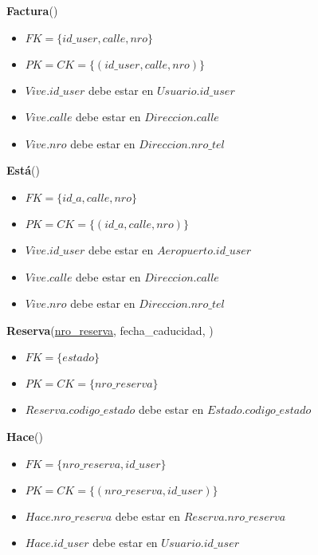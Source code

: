 \vspace*{0.1cm}
\noindent
\textbf{Factura}(\underline{})
\begin{itemize}[noitemsep]
    \item $FK = \{id\_user, calle, nro\}$
    \item $PK = CK = \{(id\_user, calle, nro)\}$
    \item $Vive.id\_user$ debe estar en $Usuario.id\_user$
    \item $Vive.calle$ debe estar en $Direccion.calle$
    \item $Vive.nro$ debe estar en $Direccion.nro\_tel$
\end{itemize}

\vspace*{0.1cm}
\noindent
\textbf{Está}(\underline{})
\begin{itemize}[noitemsep]
    \item $FK = \{id\_a, calle, nro\}$
    \item $PK = CK = \{(id\_a, calle, nro)\}$
    \item $Vive.id\_user$ debe estar en $Aeropuerto.id\_user$
    \item $Vive.calle$ debe estar en $Direccion.calle$
    \item $Vive.nro$ debe estar en $Direccion.nro\_tel$
\end{itemize}


\vspace*{0.1cm}
\noindent
\textbf{Reserva}(\underline{nro\_reserva}, fecha\_caducidad, 
    )
\begin{itemize}[noitemsep]
	\item $FK = \{estado\}$
	\item $PK = CK = \{nro\_reserva\}$
	\item $Reserva.codigo\_estado$ debe estar en $Estado.codigo\_estado$
\end{itemize}


\newpage
\vspace*{0.1cm}
\noindent
\textbf{Hace}(\underline{})
\begin{itemize}[noitemsep]
	\item $FK = \{nro\_reserva, id\_user\}$
	\item $PK = CK = \{(nro\_reserva, id\_user)\}$
	\item $Hace.nro\_reserva$ debe estar en $Reserva.nro\_reserva$
	\item $Hace.id\_user$ debe estar en $Usuario.id\_user$
\end{itemize}

